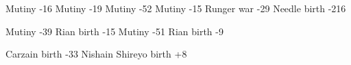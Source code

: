              {Mutiny}      {-16}
          {Mutiny}      {-19}
  {Mutiny}      {-52}
            {Mutiny}      {-15}
           {Runger war}  {-29}
            {Needle birth}{ -2}{16}

        {Mutiny}      {-39}
          {Rian birth}  {-15}
             {Mutiny}      {-51}
           {Rian birth}  {-9}

\begin{comment}
\subsubsection{In Redglen}
\end{comment}

\begin{comment}
\paragraph{Shireyo household}
\end{comment}

\newcommand{\Shachar}    {Shachar\xspace}
\newcommand{\Shireyo}    {Shachar\xspace}
\newcommand{\MrShachar}  {\Mr{} \Shireyo}
\newcommand{\MrShireyo}  {\Mr{} \Shireyo}
\newcommand{\DaiShireyo} {\Dai\Shireyo}

\newcommand{\Roanne}   {Roanne\xspace}

\newcommand{\Deracil}   {\Deracille}
\newcommand{\Delishe}   {\Deracille}
\newcommand{\Deracille} {D\'er\^a\c cille\xspace}

\newcommand{\CarzainDeracilleShireyo} {Carzain \Deracille{} \Shireyo}
\newcommand{\CarzainShireyo}          {Carzain \Shireyo}
\newcommand{\CarzainShachar}          {Carzain \Shachar}

    {Carzain birth}            {-33}
   {Nishain Shireyo birth}    {+8}

\begin{comment}
\paragraph{Others}
\end{comment}

